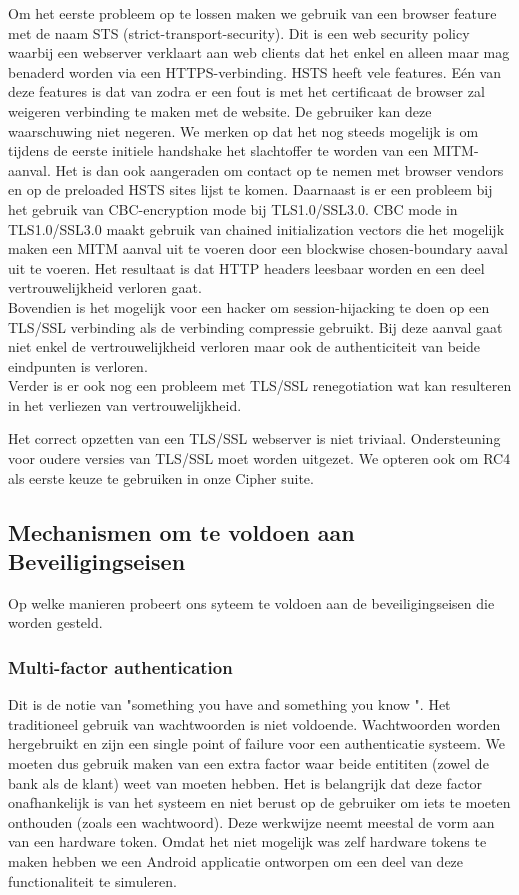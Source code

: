 \documentclass[11pt]{article}
\begin{document}
Om het eerste probleem op te lossen maken we gebruik van een browser feature met de naam STS (strict-transport-security). Dit is een web security policy waarbij een webserver verklaart aan web clients dat het enkel en alleen maar mag benaderd worden via een HTTPS-verbinding. HSTS heeft vele features. E\'en van deze features is dat van zodra er een fout is met het certificaat de browser zal weigeren verbinding te maken met de website. De gebruiker kan deze waarschuwing niet negeren. We merken op dat het nog steeds mogelijk is om tijdens de eerste initiele handshake het slachtoffer te worden van een MITM-aanval. Het is dan ook aangeraden om contact op te nemen met browser vendors en op de preloaded HSTS sites lijst te komen. \cite{HSTS} \cite{STS} \cite{prehsts}
\newline
Daarnaast is er een probleem bij het gebruik van CBC-encryption mode bij TLS1.0/SSL3.0. CBC mode in TLS1.0/SSL3.0 maakt gebruik van chained initialization vectors die het mogelijk maken een MITM aanval uit te voeren door een blockwise chosen-boundary aaval uit te voeren. Het resultaat is dat HTTP headers leesbaar worden en een deel vertrouwelijkheid verloren gaat.\cite{BEAST} \\

Bovendien is het mogelijk voor een hacker om session-hijacking te doen op een TLS/SSL verbinding als de verbinding compressie gebruikt. Bij deze aanval gaat niet enkel de vertrouwelijkheid verloren maar ook de authenticiteit van beide eindpunten is verloren. \cite{CRIME}\\

Verder is er ook nog een probleem met TLS/SSL renegotiation wat kan resulteren in het verliezen van vertrouwelijkheid. \cite{reg}

Het correct opzetten van een TLS/SSL webserver is niet triviaal. Ondersteuning voor oudere versies van TLS/SSL moet worden uitgezet. We opteren ook om RC4 als eerste keuze te gebruiken in onze Cipher suite.
\subsection{Mechanismen om te voldoen aan Beveiligingseisen}
Op welke manieren probeert ons syteem te voldoen aan de beveiligingseisen die worden gesteld.

\subsubsection{Multi-factor authentication}
Dit is de notie van "something you have and something you know ". 
\cite{multi_f}
Het traditioneel gebruik van wachtwoorden is niet voldoende. Wachtwoorden worden hergebruikt en zijn een single point of failure voor een authenticatie systeem. We moeten dus gebruik maken van een extra factor waar beide entititen (zowel de bank als de klant) weet van moeten hebben. Het is belangrijk dat deze factor onafhankelijk is van het systeem en niet berust op de gebruiker om iets te moeten onthouden (zoals een wachtwoord). Deze werkwijze neemt meestal de vorm aan van een hardware token. Omdat het niet mogelijk was zelf hardware tokens te maken hebben we een Android applicatie ontworpen om een deel van deze functionaliteit te simuleren.
\end{document}
